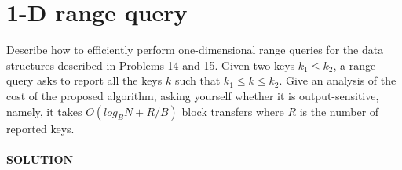 \documentclass[a4paper]{article}
\begin{document}
\section*{1-D range query}
Describe how to efficiently perform one-dimensional range queries
for the data structures described in Problems 14 and 15. Given two keys $k_1 \leq k_2$, a
range query asks to report all the keys $k$ such that $k_1 \leq k \leq k_2$. Give an analysis of the
cost of the proposed algorithm, asking yourself whether it is output-sensitive, namely,
it takes $O(log_B N + R/B)$ block transfers where $R$ is the number of reported keys.
\
\\
\\
\textbf{SOLUTION}
\\
\\
\end{document}
